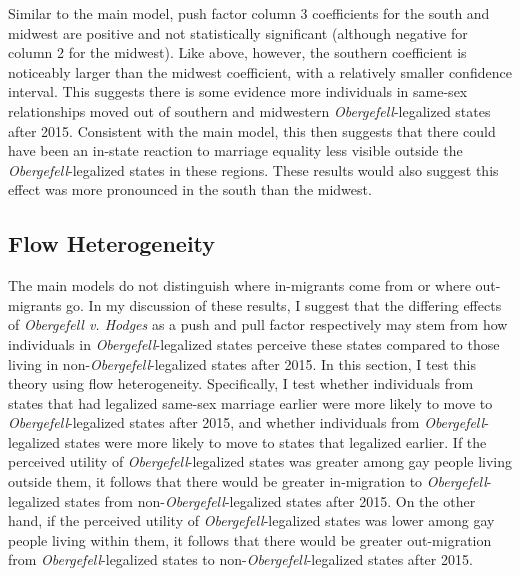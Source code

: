 \documentclass[12pt,letterpaper]{article}
\begin{document}
\begin{table}[htbp]
    \centering
    \caption{Push Factor Model: South}
    \label{tab: south_exante_model}
    
\end{table}
\begin{table}[htbp]
    \centering
    \caption{Push Factor Model: Midwest}
    \label{tab: midwest_exante_model}
    
\end{table}

\FloatBarrier
Similar to the main model, push factor column 3 coefficients for the south and midwest are positive and not statistically significant (although negative for column 2 for the midwest). Like above, however, the southern coefficient is noticeably larger than the midwest coefficient, with a relatively smaller confidence interval. This suggests there is some evidence more individuals in same-sex relationships moved out of southern and midwestern \textit{Obergefell}-legalized states after 2015. Consistent with the main model, this then suggests that there could have been an in-state reaction to marriage equality less visible outside the \textit{Obergefell}-legalized states in these regions. These results would also suggest this effect was more pronounced in the south than the midwest.

\FloatBarrier
\subsection{Flow Heterogeneity}

The main models do not distinguish where in-migrants come from or where out-migrants go.  In my discussion of these results, I suggest that the differing effects of \textit{Obergefell v. Hodges} as a push and pull factor respectively may stem from how individuals in \textit{Obergefell}-legalized states perceive these states compared to those living in non-\textit{Obergefell}-legalized states after 2015.  In this section, I test this theory using flow heterogeneity.  Specifically, I test whether individuals from states that had legalized same-sex marriage earlier were more likely to move to \textit{Obergefell}-legalized states after 2015, and whether individuals from \textit{Obergefell}-legalized states were more likely to move to states that legalized earlier. If the perceived utility of \textit{Obergefell}-legalized states was greater among gay people living outside them, it follows that there would be greater in-migration to \textit{Obergefell}-legalized states from non-\textit{Obergefell}-legalized states after 2015. On the other hand, if the perceived utility of \textit{Obergefell}-legalized states was lower among gay people living within them, it follows that there would be greater out-migration from \textit{Obergefell}-legalized states to non-\textit{Obergefell}-legalized states after 2015.
\end{document}
